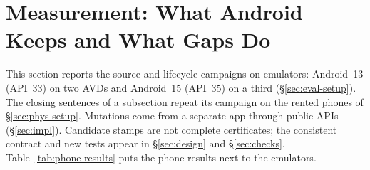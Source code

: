 \section{Measurement: What Android Keeps and What Gaps Do}
\label{sec:measurement}

This section reports the source and lifecycle campaigns on emulators: Android~13 (API~33) on two AVDs and Android~15 (API~35) on a third (\S\ref{sec:eval-setup}). The closing sentences of a subsection repeat its campaign on the rented phones of \S\ref{sec:phys-setup}. Mutations come from a separate app through public APIs (\S\ref{sec:impl}). Candidate stamps are not complete certificates; the consistent contract and new tests appear in \S\ref{sec:design} and \S\ref{sec:checks}. Table~\ref{tab:phone-results} puts the phone results next to the emulators.

